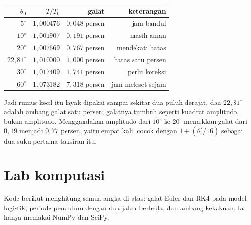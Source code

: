 \begin{center}
{\small
\begin{tabular}{rrrr}
\hline
$\theta_{0}$ & $T/T_{0}$ & galat & keterangan \\
\hline
$5^{\circ}$ & $1{,}000476$ & $0{,}048$ persen & jam bandul \\
$10^{\circ}$ & $1{,}001907$ & $0{,}191$ persen & masih aman \\
$20^{\circ}$ & $1{,}007669$ & $0{,}767$ persen & mendekati batas \\
$22{,}81^{\circ}$ & $1{,}010000$ & $1{,}000$ persen & batas satu persen \\
$30^{\circ}$ & $1{,}017409$ & $1{,}741$ persen & perlu koreksi \\
$60^{\circ}$ & $1{,}073182$ & $7{,}318$ persen & jam meleset sejam \\
\hline
\end{tabular}}
\end{center}

Jadi rumus kecil itu layak dipakai sampai sekitar dua puluh derajat, dan
$22{,}81^{\circ}$ adalah ambang galat satu persen; galatnya tumbuh seperti kuadrat
amplitudo, bukan amplitudo.
Menggandakan amplitudo dari $10^{\circ}$ ke $20^{\circ}$ menaikkan galat dari
$0{,}19$ menjadi $0{,}77$ persen, yaitu empat kali, cocok dengan
$1+(\theta_{0}^{2}/16)$ sebagai dua suku pertama taksiran itu.


\section{Lab komputasi}

Kode berikut menghitung semua angka di atas: galat Euler dan RK4 pada model
logistik, periode pendulum dengan dua jalan berbeda, dan ambang kekakuan. Ia
hanya memakai NumPy dan SciPy.

